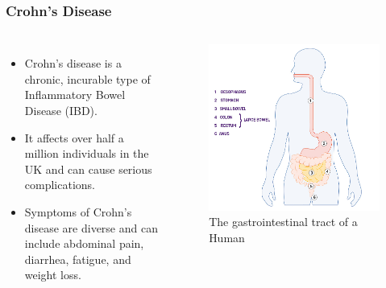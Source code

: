 \documentclass{beamer}
\begin{document}
\begin{frame}
\frametitle{Crohn's Disease}

\begin{columns}[c] %

	\begin{itemize}
		\item Crohn's disease is a chronic, incurable type of Inflammatory Bowel Disease (IBD).
		\item It affects over half a million individuals in the UK and can cause serious complications.
		\item Symptoms of Crohn's disease are diverse and can include abdominal pain, diarrhea, fatigue, and weight loss.
		\end{itemize}
	
	\begin{figure}[htp]
		\centering
		\includegraphics[width=\textwidth]{../figures/digestion-graphic.jpg}
		\caption{The gastrointestinal tract of a Human}
		\label{fig:gi-tract}
	\end{figure}
	
	\end{columns}
\end{frame}
\end{document}
